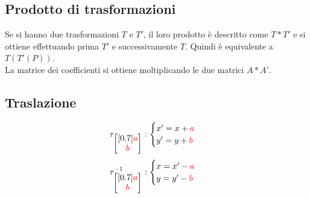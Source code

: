 \subsection{Prodotto di trasformazioni}
Se si hanno due trasformazioni $T$ e $T'$, il loro prodotto è descritto come $T\ast T'$ e si ottiene
effettuando prima $T'$ e successivamente $T$. Quindi è equivalente a $T(T'(P))$.\\
La matrice dei coefficienti si ottiene moltiplicando le due matrici $A\ast A'$.

\subsection{Traslazione}
\begin{center}
\end{center}
\begin{equation*}
\tau_{\begin{bmatrix}[0.7]
	\mathcolor{red}{a}\\\mathcolor{red}{b}
	\end{bmatrix}}:
\begin{cases}
x'= x+\mathcolor{red}{a}\\
y'= y+\mathcolor{red}{b}
\end{cases}
\end{equation*}
\begin{equation*}
\tau_{\begin{bmatrix}[0.7]
	\mathcolor{red}{a}\\\mathcolor{red}{b}
	\end{bmatrix}}^{-1}:
\begin{cases}
x = x'-\mathcolor{red}{a}\\
y = y'-\mathcolor{red}{b}
\end{cases}
\end{equation*}

